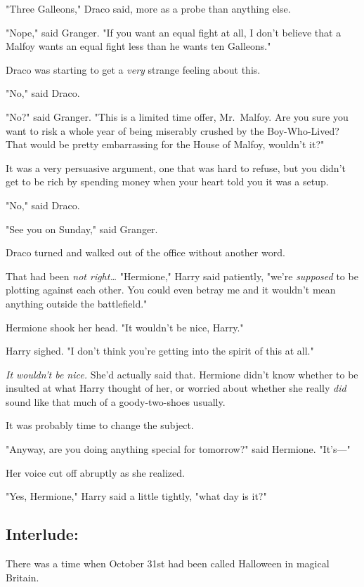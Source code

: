 "Three Galleons," Draco said, more as a probe than anything else.

"Nope," said Granger. "If you want an equal fight at all, I don't believe that 
a Malfoy wants an equal fight less than he wants ten Galleons."

Draco was starting to get a \emph{very} strange feeling about this.

"No," said Draco.

"No?" said Granger. "This is a limited time offer, Mr.~Malfoy. Are you sure you 
want to risk a whole year of being miserably crushed by the Boy-Who-Lived? That 
would be pretty embarrassing for the House of Malfoy, wouldn't it?"

It was a very persuasive argument, one that was hard to refuse, but you didn't 
get to be rich by spending money when your heart told you it was a setup.

"No," said Draco.

"See you on Sunday," said Granger.

Draco turned and walked out of the office without another word.

That had been \emph{not right{\ldots}}
\sbreak
"Hermione," Harry said patiently, "we're \emph{supposed} to be plotting against 
each other. You could even betray me and it wouldn't mean anything outside the 
battlefield."

Hermione shook her head. "It wouldn't be nice, Harry."

Harry sighed. "I don't think you're getting into the spirit of this at all."

\emph{It wouldn't be nice.} She'd actually said that. Hermione didn't know 
whether to be insulted at what Harry thought of her, or worried about whether 
she really \emph{did} sound like that much of a goody-two-shoes usually.

It was probably time to change the subject.

"Anyway, are you doing anything special for tomorrow?" said Hermione. "It's---"

Her voice cut off abruptly as she realized.

"Yes, Hermione," Harry said a little tightly, "what day is it?"
\sbreak
\subsection{Interlude:}

There was a time when October 31st had been called Halloween in magical Britain.

